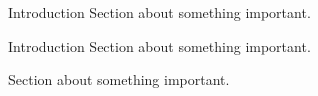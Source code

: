 \documentclass[final,t]{beamer}
\begin{document}
\begin{frame}
\begin{columns}[t]
\begin{column}{.32\linewidth}
  \begin{custombox}{Introduction}
      Section about something important.
  \end{custombox}
  
  \begin{custombox}{Introduction}
      Section about something important.
  \end{custombox}
  \begin{custombox}{}
      Section about something important.
  \end{custombox}
  
  
  \end{column}
  \end{columns}
    
\end{frame}
\end{document}
